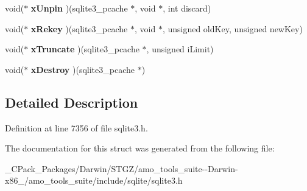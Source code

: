 \begin{DoxyCompactItemize}
void($\ast$ {\bfseries x\+Unpin} )(sqlite3\+\_\+pcache $\ast$, void $\ast$, int discard)
\item 
\mbox{\label{structsqlite3__pcache__methods_adc5552190f1de86eb95d91e9cf8430e6}} 
void($\ast$ {\bfseries x\+Rekey} )(sqlite3\+\_\+pcache $\ast$, void $\ast$, unsigned old\+Key, unsigned new\+Key)
\item 
\mbox{\label{structsqlite3__pcache__methods_aad73f9335999770bcd2dc6a2d914b4f0}} 
void($\ast$ {\bfseries x\+Truncate} )(sqlite3\+\_\+pcache $\ast$, unsigned i\+Limit)
\item 
\mbox{\label{structsqlite3__pcache__methods_aac18fc581d8d63550a6657016c24ba5d}} 
void($\ast$ {\bfseries x\+Destroy} )(sqlite3\+\_\+pcache $\ast$)
\end{DoxyCompactItemize}


\subsection{Detailed Description}


Definition at line 7356 of file sqlite3.\+h.



The documentation for this struct was generated from the following file\+:\begin{DoxyCompactItemize}
\item 
\+\_\+\+C\+Pack\+\_\+\+Packages/\+Darwin/\+S\+T\+G\+Z/amo\+\_\+tools\+\_\+suite-\/-\/\+Darwin-\/x86\+\_/amo\+\_\+tools\+\_\+suite/include/sqlite/sqlite3.\+h\end{DoxyCompactItemize}
